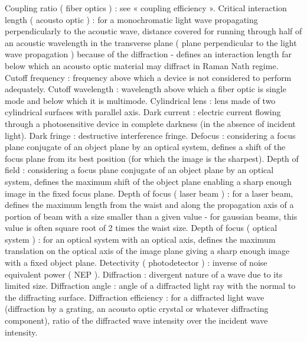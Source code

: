 Coupling ratio ( fiber optics )                      : see « coupling efficiency ».
Critical interaction length ( acousto optic )        : for a monochromatic light wave propagating perpendicularly to the acoustic wave, distance covered for running through half of an acoustic wavelength in the transverse plane ( plane perpendicular to the light wave propagation ) because of the diffraction - defines an interaction length far below which an acousto optic material may diffract in Raman Nath regime.
Cutoff frequency                                     : frequency above which a device is not considered to perform adequately.
Cutoff wavelength                                    : wavelength above which a fiber optic is single mode and below which it is multimode.
Cylindrical lens                                     : lens made of two cylindrical surfaces with parallel axis.
Dark current                                         : electric current flowing through a photosensitive device in complete darkness (in the absence of incident light).
Dark fringe                                          : destructive interference fringe.
Defocus                                              : considering a focus plane conjugate of an object plane by an optical system, defines a shift of the focus plane from its best position (for which the image is the sharpest).
Depth of field                                       : considering a focus plane conjugate of an object plane by an optical system, defines the maximum shift of the object plane enabling a sharp enough image in the fixed focus plane.
Depth of focus ( laser beam )                        : for a laser beam, defines the maximum length from the waist and along the propagation axis of a portion of beam with a size smaller than a given value - for gaussian beams, this value is often square root of 2 times the waist size.
Depth of focus ( optical system )                    : for an optical system with an optical axis, defines the maximum translation on the optical axis of the image plane giving a sharp enough image with a fixed object plane.
Detectivity ( photodetector )                        : inverse of noise equivalent power ( NEP ).
Diffraction                                          : divergent nature of a wave due to its limited size.
Diffraction angle                                    : angle of a diffracted light ray with the normal to the diffracting surface.
Diffraction efficiency                               : for a diffracted light wave (diffraction by a grating, an acousto optic crystal or whatever diffracting component), ratio of the diffracted wave intensity over the incident wave intensity.
